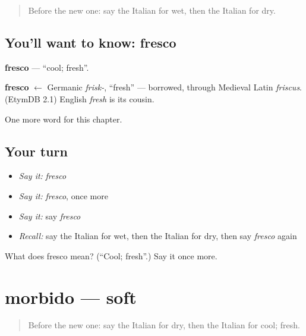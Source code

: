 \label{lesson:IT-C128-fresco}



\begin{quote}
Before the new one: say the Italian for wet, then the Italian for dry.
\end{quote}

\subsection*{You'll want to know: fresco}
\textbf{fresco} — \textquotedblleft{}cool; fresh\textquotedblright{}.

\begin{cousinweb}
\textbf{fresco} $\leftarrow$ Germanic \emph{frisk-}, \textquotedblleft{}fresh\textquotedblright{} — borrowed, through Medieval Latin \emph{friscus}. (EtymDB 2.1) English \emph{fresh} is its cousin.
\end{cousinweb}

\begin{grammarlens}[title={What you've built}]
One more word for this chapter.
\end{grammarlens}

\subsection*{Your turn}
\begin{itemize}
\raggedright
  \item \emph{Say it:} \emph{fresco}
  \item \emph{Say it:} \emph{fresco}, once more
  \item \emph{Say it:} say \emph{fresco}
  \item \emph{Recall:} say the Italian for wet, then the Italian for dry, then say \emph{fresco} again
\end{itemize}

\begin{tcolorbox}[breakable,colback=teal!4,colframe=teal!35!black,title={Before you move on}]
What does fresco mean? (\textquotedblleft{}Cool; fresh\textquotedblright{}.) Say it once more.
\end{tcolorbox}
\section[morbido]{morbido — soft}

\label{lesson:IT-C128-morbido}



\begin{quote}
Before the new one: say the Italian for dry, then the Italian for cool; fresh.
\end{quote}

